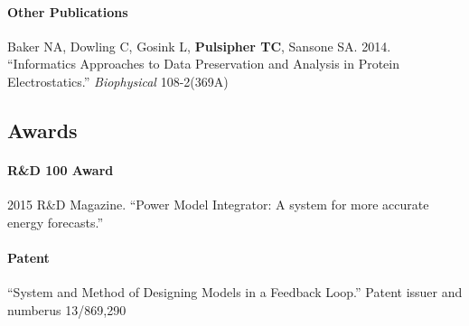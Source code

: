 \documentclass[11pt,]{article}
\let\oldparagraph\paragraph
\renewcommand{\paragraph}[1]{\oldparagraph{#1}\mbox{}}
\begin{document}
\paragraph{Other Publications}\label{other-publications}

Baker NA, Dowling C, Gosink L, \textbf{Pulsipher TC}, Sansone SA. 2014.
``Informatics Approaches to Data Preservation and Analysis in Protein
Electrostatics.'' \emph{Biophysical} 108-2(369A)

\subsection{Awards}\label{awards}

\paragraph{R\&D 100 Award}\label{rd-100-award}

2015 R\&D Magazine. ``Power Model Integrator: A system for more accurate
energy forecasts.''

\paragraph{Patent}\label{patent}

``System and Method of Designing Models in a Feedback Loop.'' Patent
issuer and numberus 13/869,290
\end{document}
